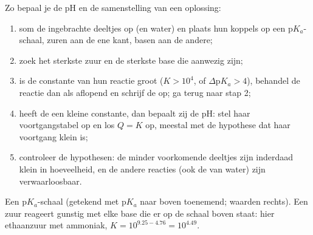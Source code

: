 \begin{method}\label{met:b1:predominant-reaction:method}
Zo bepaal je de pH en de samenstelling van een oplossing:
\begin{enumerate}
  \item som de ingebrachte deeltjes op (en water) en plaats hun koppels
        op een $\mathrm{p}K_a$-schaal, zuren aan de ene kant, basen aan de
        andere;
  \item zoek het sterkste zuur en de sterkste base die aanwezig zijn;
  \item is de constante van hun reactie groot ($K > 10^4$, of
        $\Delta\mathrm{p}K_a > 4$), behandel de reactie dan als aflopend
        en schrijf de  op; ga terug naar stap 2;
  \item heeft de  een kleine constante, dan bepaalt
        zij de pH: stel haar voortgangstabel op en los $Q = K$ op, meestal
        met de hypothese dat haar voortgang klein is;
  \item controleer de hypothesen: de minder voorkomende deeltjes zijn
        inderdaad klein in hoeveelheid, en de andere reacties (ook de
         van water) zijn verwaarloosbaar.
\end{enumerate}
\end{method}

\begin{omfigure}

{\small Een $\mathrm{p}K_a$-schaal (getekend met p$K_a$ naar boven
toenemend; waarden rechts). Een zuur reageert gunstig met elke base die
er op de schaal boven staat: hier ethaanzuur met ammoniak,
$K = 10^{9.25 - 4.76} = 10^{4.49}$.}
\end{omfigure}

